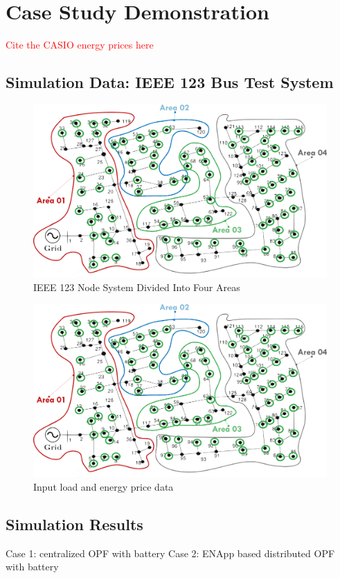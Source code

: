 \documentclass{article}
\begin{document}
\section{Case Study Demonstration}

\textcolor{red}{Cite the CASIO energy prices here}
\subsection{Simulation Data: IEEE 123 Bus Test System}

\begin{figure}[h!]
    \centering
    \includegraphics[width=\linewidth]{../figures/ieee123-FourAreas.png}
    \caption{IEEE 123 Node System Divided Into Four Areas}
    \label{fig:ieee123-four-area-figure}
\end{figure}


\begin{figure}[h!]
    \centering
    \includegraphics[width=\linewidth]{../figures/ieee123-FourAreas.png}
    \caption{Input load and energy price data}
    \label{fig:input_data}
\end{figure}



\subsection{Simulation Results}
Case 1: centralized OPF with battery
Case 2: ENApp based distributed OPF with battery
\end{document}
